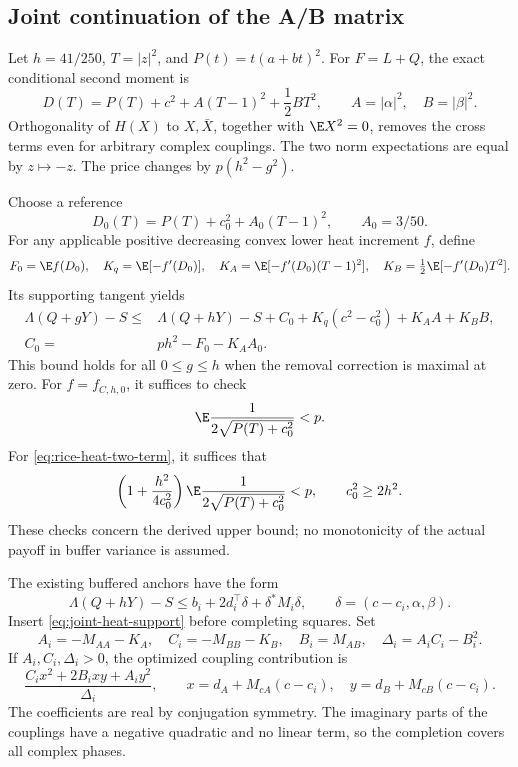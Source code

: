 \subsection{Joint continuation of the A/B matrix}
Let \(h=41/250\), \(T=|z|^2\), and \(P(t)=t(a+bt)^2\).
For \(F=L+Q\), the exact conditional second moment is
\[
D(T)=P(T)+c^2+A(T-1)^2+\frac12BT^2,\qquad
A=|\alpha|^2,\quad B=|\beta|^2.
\]
Orthogonality of \(H(X)\) to \(X,\bar X\), together with
\(\E X^2=0\), removes the cross terms even for arbitrary complex
couplings.  The two norm expectations are equal by \(z\mapsto-z\).
The price changes by \(p(h^2-g^2)\).

Choose a reference
\[
D_0(T)=P(T)+c_0^2+A_0(T-1)^2,\qquad A_0=3/50.
\]
For any applicable positive decreasing convex lower heat increment
\(f\), define
\[
F_0=\E f(D_0),\quad
K_q=\E[-f'(D_0)],\quad
K_A=\E[-f'(D_0)(T-1)^2],\quad
K_B=\tfrac12\E[-f'(D_0)T^2].
\]
Its supporting tangent yields
\begin{equation}
\begin{split}
\Lambda(Q+gY)-S
\le{}&\Lambda(Q+hY)-S+C_0+
K_q(c^2-c_0^2)+K_AA+K_BB,\\
C_0={}&ph^2-F_0-K_AA_0.
\end{split}
\label{eq:joint-heat-support}
\end{equation}
This bound holds for all \(0\le g\le h\) when the removal correction
is maximal at zero.  For \(f=f_{C,h,0}\), it suffices to check
\[
\E\frac1{2\sqrt{P(T)+c_0^2}}<p.
\]
For \eqref{eq:rice-heat-two-term}, it suffices that
\[
\left(1+\frac{h^2}{4c_0^2}\right)
\E\frac1{2\sqrt{P(T)+c_0^2}}<p,\qquad c_0^2\ge2h^2.
\]
These checks concern the derived upper bound; no monotonicity of the
actual payoff in buffer variance is assumed.

The existing buffered anchors have the form
\[
\Lambda(Q+hY)-S\le b_i+2d_i^\top\delta+\delta^*M_i\delta,
\qquad\delta=(c-c_i,\alpha,\beta).
\]
Insert \eqref{eq:joint-heat-support} before completing squares.
Set
\[
A_i=-M_{AA}-K_A,\quad C_i=-M_{BB}-K_B,\quad
B_i=M_{AB},\quad\Delta_i=A_iC_i-B_i^2.
\]
If \(A_i,C_i,\Delta_i>0\), the optimized coupling contribution is
\[
\frac{C_ix^2+2B_i xy+A_i y^2}{\Delta_i},\qquad
x=d_A+M_{cA}(c-c_i),\quad y=d_B+M_{cB}(c-c_i).
\]
The coefficients are real by conjugation symmetry.  The imaginary
parts of the couplings have a negative quadratic and no linear
term, so the completion covers all complex phases.

